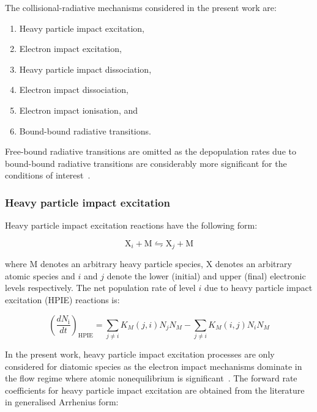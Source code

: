 The collisional-radiative mechanisms considered in the present work are:

\begin{enumerate}
 \item Heavy particle impact excitation,
 \item Electron impact excitation,
 \item Heavy particle impact dissociation,
 \item Electron impact dissociation,
 \item Electron impact ionisation, and
 \item Bound-bound radiative transitions.
\end{enumerate}

Free-bound radiative transitions are omitted as the depopulation rates due to bound-bound radiative transitions are considerably more significant for the conditions of interest~\cite{JohnPhd}.


\subsubsection{Heavy particle impact excitation}

Heavy particle impact excitation reactions have the following form:

\begin{equation}
 \text{X}_i + \text{M} \leftrightharpoons  \text{X}_j + \text{M}
\end{equation}

\noindent where M denotes an arbitrary heavy particle species, X denotes an arbitrary atomic species and $i$ and $j$ denote the lower (initial) and upper (final) electronic levels respectively.
The net population rate of level $i$ due to heavy particle impact excitation (HPIE) reactions is:

\begin{equation}
 \left ( \frac{dN_\text{i}}{dt} \right )_\text{HPIE} =  \sum_{j \neq i} K_{M}(j,i) N_{j} N_{M} - \sum_{j \neq i} K_{M} (i,j) N_{i} N_{M} 
\end{equation}

\par

In the present work, heavy particle impact excitation processes are only considered for diatomic species as the electron impact mechanisms dominate in the flow regime where atomic nonequilibrium is significant~\cite{park_1990,JohnPhd}.
The forward rate coefficients for heavy particle impact excitation are obtained from the literature in generalised Arrhenius form:

